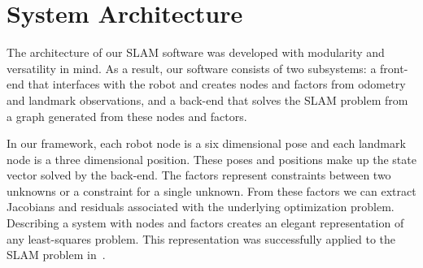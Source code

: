 \documentclass[conference]{IEEEtran}
\begin{document}







 


\section{System Architecture}
\label{sec:systemarchitecture}


The architecture of our \ac{SLAM} software was developed with modularity and versatility
in mind.  As a result, our software consists of two subsystems: a
front-end that interfaces with the robot and creates nodes and factors from
odometry and landmark observations, and a back-end that solves the \ac{SLAM} problem from
a graph generated from these nodes and factors.

In our framework, each robot node is a six dimensional pose and each landmark node is a
three dimensional position. These poses and positions make up the state vector solved by
the back-end. The factors represent constraints between two unknowns or a constraint for a
single unknown. From these factors we can extract Jacobians and residuals associated with
the underlying optimization problem. Describing a system with nodes and factors creates
an elegant representation of any least-squares problem. This representation was
successfully applied to the \ac{SLAM} problem in~\cite{dellaert2005square}.
\end{document}

